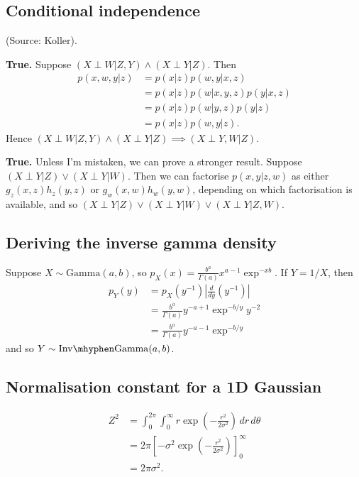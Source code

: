 \documentclass{article}
\begin{document}
\subsection{Conditional independence}
(Source: Koller).

\textbf{True.} Suppose $(X \perp W|Z,Y) \land (X \perp Y|Z)$. Then \begin{align*}
p(x,w,y|z) &= p(x|z)p(w,y|x,z) \tag{chain rule}\\
&= p(x|z)p(w|x,y,z)p(y|x,z) \tag{chain rule}\\
&= p(x|z)p(w|y,z)p(y|z) \tag{conditional independence}\\
&= p(x|z)p(w,y|z).
\end{align*}
Hence $(X \perp W|Z,Y) \land (X \perp Y|Z) \implies (X \perp Y,W|Z)$.

\textbf{True.} Unless I'm mistaken, we can prove a stronger result. Suppose $(X \perp Y|Z) \lor (X \perp Y|W)$. Then
we can factorise $p(x,y|z,w)$ as either $g_z(x,z)h_z(y,z)$ or $g_w(x,w)h_w(y,w)$, depending on which factorisation is available, and so $(X \perp Y|Z) \lor (X \perp Y|W) \lor (X \perp Y|Z,W)$.

\subsection{Deriving the inverse gamma density}
Suppose $X \sim \mathrm{Gamma}(a,b)$, so $p_X(x) = \frac{b^a}{\Gamma(a)} x^{a-1} \exp^{-xb}$. If $Y=1/X$, then
\begin{align*}
p_Y(y) &= p_X(y^{-1})\left|\frac{d}{dy}(y^{-1})\right|\\
&= \frac{b^a}{\Gamma(a)} y^{-a+1} \exp^{-b/y} y^{-2}\\
&= \frac{b^a}{\Gamma(a)} y^{-a-1} \exp^{-b/y}
\end{align*}
and so $Y \sim \mathrm{Inv \mhyphen Gamma}(a,b)$.

\subsection{Normalisation constant for a 1D Gaussian}
\begin{align*}
Z^2 &= \int_{0}^{2\pi} \int_{0}^{\infty} r \exp\left(-\frac{r^2}{2\sigma^2}\right) \,dr \,d\theta\\
&= 2\pi \left[-\sigma^2 \exp\left(-\frac{r^2}{2\sigma^2}\right) \right]_{0}^{\infty}\\
&= 2\pi\sigma^2.
\end{align*}
\end{document}
